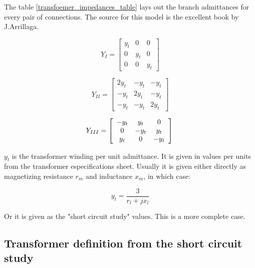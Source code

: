 \documentclass{tufte-book}
\begin{document}
The table \ref{transfoemer_impedances_table} lays out the branch admittances for every pair of connections. The source for this model is the excellent book by J.Arrillaga\cite{arrillaga1990computer}.

\begin{equation}
Y_{I} = \left[ \begin{array}{ccc}
y_t & 0 &  0 \\
0 & y_t & 0 \\ 
0 & 0 & y_t
\end{array} \right] 
\end{equation}

\begin{equation}
Y_{II} = \left[ \begin{array}{ccc}
2y_t & -y_t &  -y_t \\
-y_t & 2y_t & -y_t \\  
-y_t & -y_t & 2y_t
\end{array} \right] 
\end{equation}

\begin{equation}
Y_{III} = \left[ \begin{array}{ccc}
-y_t & y_t &  0 \\
0 & -y_t & y_t \\ 
y_t & 0 & -y_t
\end{array} \right] \newline
\end{equation}


$y_t$ is the transformer winding per unit admittance. It is given in values per units from the transformer especifications sheet. Usually it is given either directly as magnetizing resistance $r_m$ and inductance $x_m$, in which case:

\begin{equation}
y_t = \frac{3}{r_l + jx_l}
\end{equation}

Or it is given as the "short circuit study" values. This is a more complete case.



\subsection{Transformer definition from the short circuit study}
\end{document}
